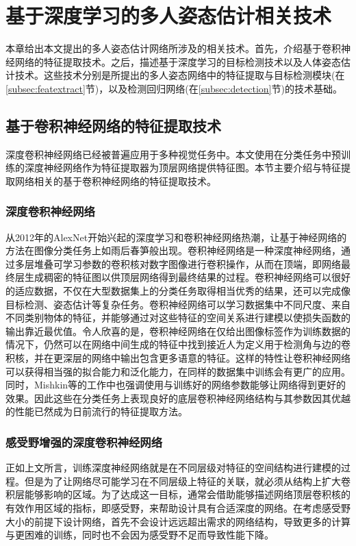 \chapter{基于深度学习的多人姿态估计相关技术}
\label{cha:basicfacts}
本章给出本文提出的多人姿态估计网络所涉及的相关技术。首先，介绍基于卷积神经网络的特征提取技术。之后，描述基于深度学习的目标检测技术以及人体姿态估计技术。这些技术分别是所提出的多人姿态网络中的特征提取与目标检测模块(在\ref{subsec:featextract}节)，以及检测回归网络(在\ref{subsec:detection}节)的技术基础。
\section{基于卷积神经网络的特征提取技术}
深度卷积神经网络已经被普遍应用于多种视觉任务中。本文使用在分类任务中预训练的深度神经网络作为特征提取器为顶层网络提供特征图。本节主要介绍与特征提取网络相关的基于卷积神经网络的特征提取技术。
\subsection{深度卷积神经网络}
\label{subsec:factsfeature}
从2012年的AlexNet\cite{alex2012alexnet}开始兴起的深度学习和卷积神经网络热潮，让基于神经网络的方法在图像分类任务上如雨后春笋般出现。卷积神经网络是一种深度神经网络，通过多层堆叠可学习参数的卷积核对数字图像进行卷积操作，从而在顶端，即网络最终层生成稠密的特征图以供顶层网络得到最终结果的过程。卷积神经网络可以很好的适应数据，不仅在大型数据集上的分类任务取得相当优秀的结果\cite{simonyan2014very}，还可以完成像目标检测、姿态估计等复杂任务。卷积神经网络可以学习数据集中不同尺度、来自不同类别物体的特征，并能够通过对这些特征的空间关系进行建模以使损失函数的输出靠近最优值。令人欣喜的是，卷积神经网络在仅给出图像标签作为训练数据的情况下，仍然可以在网络中间生成的特征中找到接近人为定义用于检测角与边的卷积核，并在更深层的网络中输出包含更多语意的特征\cite{yosinski2015understanding}。这样的特性让卷积神经网络可以获得相当强的拟合能力和泛化能力，在同样的数据集中训练会有更广的应用。同时，Mishkin等的工作中\cite{mishkin2015all}也强调使用与训练好的网络参数能够让网络得到更好的效果。因此这些在分类任务上表现良好的底层卷积神经网络结构与其参数因其优越的性能已然成为日前流行的特征提取方法。
\subsection{感受野增强的深度卷积神经网络}
\label{subsec:factsdeepextract}
正如上文所言，训练深度神经网络就是在不同层级对特征的空间结构进行建模的过程。但是为了让网络尽可能学习在不同层级上特征的关联，就必须从结构上扩大卷积层能够影响的区域。为了达成这一目标，通常会借助能够描述网络顶层卷积核的有效作用区域的指标，即感受野，来帮助设计具有合适深度的网络。在考虑感受野大小的前提下设计网络，首先不会设计远远超出需求的网络结构，导致更多的计算与更困难的训练，同时也不会因为感受野不足而导致性能下降。

